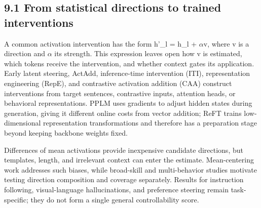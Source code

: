 \subsection*{9.1 From statistical directions to trained interventions}

A common activation intervention has the form h'\_l = h\_l + \ensuremath{\alpha}v, where v is a direction and \ensuremath{\alpha} its strength. This expression leaves open how v is estimated, which tokens receive the intervention, and whether context gates its application. Early latent steering, ActAdd, inference-time intervention (ITI), representation engineering (RepE), and contrastive activation addition (CAA) construct interventions from target sentences, contrastive inputs, attention heads, or behavioral representations.\cite{r89,r90,r91,r92,r93,r94,r95} PPLM uses gradients to adjust hidden states during generation, giving it different online costs from vector addition; ReFT trains low-dimensional representation transformations and therefore has a preparation stage beyond keeping backbone weights fixed.\cite{r88,r99}


Differences of mean activations provide inexpensive candidate directions, but templates, length, and irrelevant context can enter the estimate. Mean-centering work addresses such biases, while broad-skill and multi-behavior studies motivate testing direction composition and coverage separately.\cite{r94,r98} Results for instruction following, visual-language hallucinations, and preference steering remain task-specific; they do not form a single general controllability score.\cite{r103,r104,r109}


\begingroup\small\setlength{\tabcolsep}{5pt}\renewcommand{\arraystretch}{1.18}

